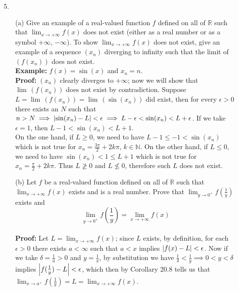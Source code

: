 \documentclass{article}
\begin{document}
\newpage
\begin{itemize}
    \item [5.] \begin{itemize}
              \item [(a)] Give an example of a real-valued function $f$ defined on all of $\mathbb{R}$ such that $\lim_{x\to+\infty}f(x)$ does not exist (either as a real number or as a symbol $+\infty$, $-\infty$). To show $\lim_{x\to+\infty}f(x)$ does not exist, give an example of a sequence $(x_n)$ diverging to infinity such that the limit of $(f(x_n))$ does not exist.\\\textbf{Example: } $f(x)=\sin(x)$ and $x_n=n$.\\\textbf{Proof: } $(x_n)$ clearly diverges to $+\infty$; now we will show that $\lim\,(f(x_n))$ does not exist by contradiction. Suppose $L=\lim\,(f(x_n))=\lim\,(\sin(x_n))$ did exist, then for every $\epsilon>0$ there exists an $N$ such that $n>N\implies\abs{\sin(x_n)-L}<\epsilon\implies L-\epsilon<\sin(x_n)<L+\epsilon$. If we take $\epsilon=1$, then $L-1<\sin(x_n)<L+1$.\\On the one hand, if $L\geq 0$, we need to have $L-1\leq-1<\sin(x_n)$ which is not true for $x_n=\frac{3\pi}{2}+2k\pi$, $k\in\mathbb{N}$. On the other hand, if $L\leq 0$, we need to have $\sin(x_n)<1\leq L+1$ which is not true for $x_n=\frac{\pi}{2}+2k\pi$. Thus $L\ngeq 0$ and $L\nleq 0$, therefore such $L$ does not exist.
              \item [(b)] Let $f$ be a real-valued function defined on all of $\mathbb{R}$ such that $\lim_{x\to+\infty}f(x)$ exists and is a real number. Prove that $\lim_{y\to 0^+}f(\frac{1}{y})$ exists and \[\lim_{y\to 0^+}f\left(\frac{1}{y}\right)=\lim_{x\to+\infty}f(x)\]\\\textbf{Proof: } Let $L=\lim_{x\to+\infty}f(x)$; since $L$ exists, by definition, for each $\epsilon>0$ there exists $a<\infty$ such that $a<x$ implies $\abs{f(x)-L}<\epsilon$. Now if we take $\delta=\frac{1}{a}>0$ and $y=\frac{1}{x}$, by substitution we have $\frac{1}{\delta}<\frac{1}{y}\implies 0<y<\delta$ implies $\abs{f(\frac{1}{y})-L}<\epsilon$, which then by Corollary 20.8 tells us that $\lim_{x\to a^+}f(\frac{1}{y})=L=\lim_{x\to+\infty}f(x)$.
          \end{itemize}
\end{itemize}
\end{document}
